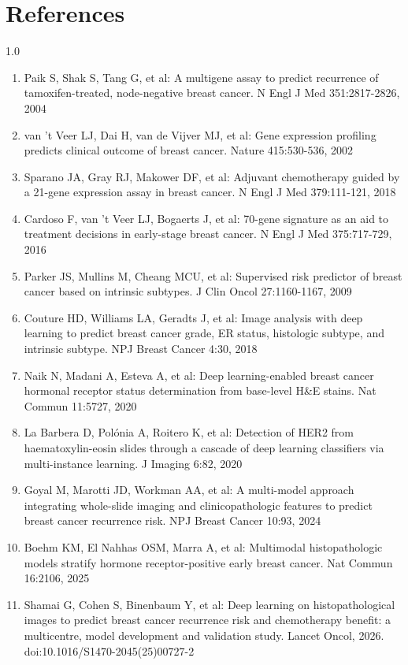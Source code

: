 \documentclass[11pt,a4paper]{article}
\begin{document}
\section*{References}
\begin{spacing}{1.0}
\begin{enumerate}\setlength{\itemsep}{2pt}
\item Paik S, Shak S, Tang G, et al: A multigene assay to predict recurrence of tamoxifen-treated, node-negative breast cancer. N Engl J Med 351:2817-2826, 2004
\item van 't Veer LJ, Dai H, van de Vijver MJ, et al: Gene expression profiling predicts clinical outcome of breast cancer. Nature 415:530-536, 2002
\item Sparano JA, Gray RJ, Makower DF, et al: Adjuvant chemotherapy guided by a 21-gene expression assay in breast cancer. N Engl J Med 379:111-121, 2018
\item Cardoso F, van 't Veer LJ, Bogaerts J, et al: 70-gene signature as an aid to treatment decisions in early-stage breast cancer. N Engl J Med 375:717-729, 2016
\item Parker JS, Mullins M, Cheang MCU, et al: Supervised risk predictor of breast cancer based on intrinsic subtypes. J Clin Oncol 27:1160-1167, 2009
\item Couture HD, Williams LA, Geradts J, et al: Image analysis with deep learning to predict breast cancer grade, ER status, histologic subtype, and intrinsic subtype. NPJ Breast Cancer 4:30, 2018
\item Naik N, Madani A, Esteva A, et al: Deep learning-enabled breast cancer hormonal receptor status determination from base-level H\&E stains. Nat Commun 11:5727, 2020
\item La Barbera D, Polónia A, Roitero K, et al: Detection of HER2 from haematoxylin-eosin slides through a cascade of deep learning classifiers via multi-instance learning. J Imaging 6:82, 2020
\item Goyal M, Marotti JD, Workman AA, et al: A multi-model approach integrating whole-slide imaging and clinicopathologic features to predict breast cancer recurrence risk. NPJ Breast Cancer 10:93, 2024
\item Boehm KM, El Nahhas OSM, Marra A, et al: Multimodal histopathologic models stratify hormone receptor-positive early breast cancer. Nat Commun 16:2106, 2025
\item Shamai G, Cohen S, Binenbaum Y, et al: Deep learning on histopathological images to predict breast cancer recurrence risk and chemotherapy benefit: a multicentre, model development and validation study. Lancet Oncol, 2026. doi:10.1016/S1470-2045(25)00727-2

\end{enumerate}
\end{spacing}
\end{document}
